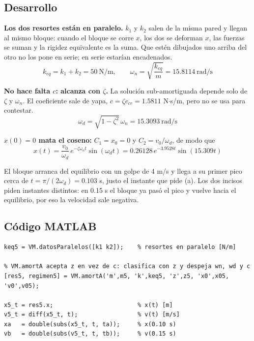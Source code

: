 \documentclass[12pt,letterpaper]{article}
\begin{document}
\subsection{Desarrollo}

\textbf{Los dos resortes están en paralelo.} $k_1$ y $k_2$ salen de la misma pared y
llegan al mismo bloque: cuando el bloque se corre $x$, los dos se deforman $x$, las
fuerzas se suman y la rigidez equivalente es la suma. Que estén dibujados uno arriba
del otro no los pone en serie; en serie estarían encadenados.
\begin{equation}
k_{eq} = k_1 + k_2 = 50\ \text{N/m}, \qquad
\omega_n = \sqrt{\frac{k_{eq}}{m}} = 15.8114\ \text{rad/s}
\end{equation}

\textbf{No hace falta $c$: alcanza con $\zeta$.} La solución sub-amortiguada depende
solo de $\zeta$ y $\omega_n$. El coeficiente sale de yapa, $c = \zeta c_{cr} = 1.5811$
N$\cdot$s/m, pero no se usa para contestar.
\begin{equation}
\omega_d = \sqrt{1-\zeta^2}\,\omega_n = 15.3093\ \text{rad/s}
\end{equation}

\textbf{$x(0) = 0$ mata el coseno:} $C_1 = x_0 = 0$ y $C_2 = v_0/\omega_d$, de modo que
\begin{equation}
x(t) = \frac{v_0}{\omega_d}\,e^{-\zeta\omega_n t}\sin(\omega_d t)
= 0.26128\,e^{-3.9528t}\sin(15.309t)
\end{equation}

El bloque arranca del equilibrio con un golpe de 4 m/s y llega a su primer pico cerca
de $t = \pi/(2\omega_d) = 0.103$ s, justo el instante que pide (a). Los dos incisos
piden instantes distintos: en 0.15 s el bloque ya pasó el pico y vuelve hacia el
equilibrio, por eso la velocidad sale negativa.

\subsection{Código MATLAB}
\begin{lstlisting}[style=matlab,numbers=none]
keq5 = VM.datosParalelos([k1 k2]);    % resortes en paralelo [N/m]

% VM.amortA acepta z en vez de c: clasifica con z y despeja wn, wd y c
[res5, regimen5] = VM.amortA('m',m5, 'k',keq5, 'z',z5, 'x0',x05, 'v0',v05);

x5_t = res5.x;                        % x(t) [m]
v5_t = diff(x5_t, t);                 % v(t) [m/s]
xa   = double(subs(x5_t, t, ta));     % x(0.10 s)
vb   = double(subs(v5_t, t, tb));     % v(0.15 s)
\end{lstlisting}
\end{document}
